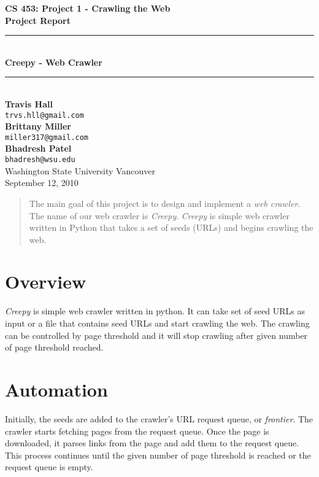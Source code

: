 \documentclass[letterpaper,11pt,twoside]{article}
\begin{document}
\begin{titlepage}
   \begin{center}
       {\Large \textbf{CS 453: Project 1 - Crawling the Web}}\\[0.5cm]
       {\Large \textbf{Project Report}}\\[3.0cm]

       {\rule{\linewidth}{0.5mm}} \\[0.5cm]
       {\Huge \textbf{Creepy - Web Crawler}}\\[0.4cm] 
       {\rule{\linewidth}{0.5mm}} \\[2.0cm]

       \textbf{Travis Hall}\\
       \texttt{trvs.hll@gmail.com}\\[0.5cm]
       \textbf{Brittany Miller}\\
       \texttt{miller317@gmail.com}\\[0.5cm]
       \textbf{Bhadresh Patel}\\
       \texttt{bhadresh@wsu.edu}\\[0.5cm]

       \vfill
       Washington State University Vancouver\\
       September 12, 2010
   \end{center}
\end{titlepage}

\begin{abstract}
The main goal of this project is to design and implement a \emph{web crawler}. The name of our web crawler is \emph{Creepy}. \emph{Creepy} is simple web crawler written in Python that takes a set of seeds (URLs) and begins crawling the web.
\end{abstract}

\section{Overview}
\emph{Creepy} is simple web crawler written in python. It can take set of seed URLs as input or a file that contains seed URLs and start crawling the web. The crawling can be controlled by page threshold and it will stop crawling after given number of page threshold reached. 

\section{Automation}
Initially, the seeds are added to the crawler's URL request queue, or \emph{frontier}. The crawler starts fetching pages from the request queue. Once the page is downloaded, it parses links from the page and add them to the request queue. This process continues until the given number of page threshold is reached or the request queue is empty.
\end{document}
